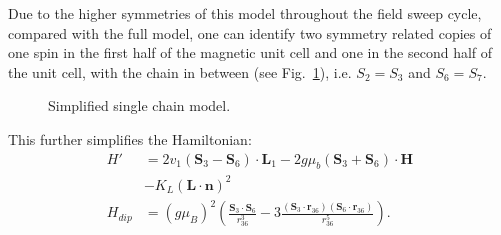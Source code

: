 Due to the higher symmetries of this model throughout the field sweep cycle, compared with the full model, one can identify two symmetry related copies of one spin in the first half of the magnetic unit cell and one in the second half of the unit cell, with the chain in between (see Fig.~\ref{fig:GdMn2O5_simple_model}), i.e. $S_2 = S_3$ and $S_6 = S_7$.
\begin{figure}
	\caption{\label{fig:GdMn2O5_simple_model} Simplified single chain model.}
\end{figure}
This further simplifies the Hamiltonian:
\begin{align}
	H' &= 2v_1(\mathbf{S}_3 - \mathbf{S}_6)\cdot\mathbf{L}_1 - 2g \mu_b (\mathbf{S}_3 + \mathbf{S}_6) \cdot \mathbf{H} \\
	&- K_L (\mathbf{L} \cdot \mathbf{n})^2 \\
	H_{dip} &= (g \mu_B)^2\left(\frac{\mathbf{S}_3\cdot \mathbf{S}_6}{r_{36}^3}-3\frac{(\mathbf{S}_3\cdot \mathbf{r}_{36})(\mathbf{S}_6\cdot \mathbf{r}_{36})}{r_{36}^5}\right).
\end{align}
\printbibliography
